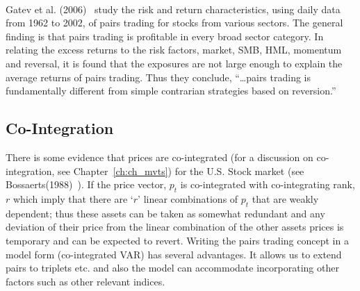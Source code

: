 \noindent{} \\[0.2cm]


Gatev et al. (2006)~\cite{ggr} study the risk and return characteristics, using daily data from 1962 to 2002, of pairs trading for stocks from various sectors. The general finding is that pairs trading is profitable in every broad sector category. In relating the excess returns to the risk factors, market, SMB, HML, momentum and reversal, it is found that the exposures are not large enough to explain the average returns of pairs trading. Thus they conclude, ``\dots pairs trading is fundamentally different from simple contrarian strategies based on reversion.''



\subsection{Co-Integration}


There is some evidence that prices are co-integrated (for a discussion on co-integration, see Chapter~\ref{ch:ch_mvts}) for the U.S. Stock market (see Bossaerts(1988)~\cite{bossaerts1988common}). If the price vector, $p_t$ is co-integrated with co-integrating rank, $r$ which imply that there are `$r$' linear combinations of $p_t$ that are weakly dependent; thus these assets can be taken as somewhat redundant and any deviation of their price from the linear combination of the other assets prices is temporary and can be expected to revert. Writing the pairs trading concept in a model form (co-integrated VAR) has several advantages. It allows us to extend pairs to triplets etc. and also the model can accommodate incorporating other factors such as other relevant indices.


